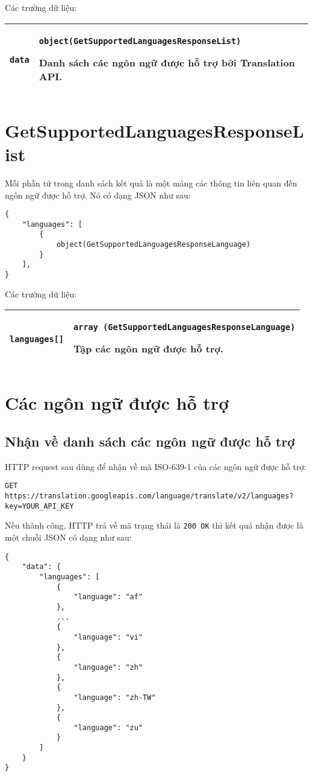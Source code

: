 \documentclass[../thesis.tex]{subfiles}
\begin{document}
Các trường dữ liệu:
\begin{center}
\begin{tabularx}{\textwidth}{|p{}|X|}
\hline
\lstinline{data} & \lstinline{object(GetSupportedLanguagesResponseList)}

Danh sách các ngôn ngữ được hỗ trợ bởi Translation API.\\
\hline
\end{tabularx}
\end{center}

\section{GetSupportedLanguagesResponseList}
Mỗi phần tử trong danh sách kết quả là một mảng các thông tin liên quan đến ngôn ngữ được hỗ trợ. Nó có dạng JSON như sau:

\begin{lstlisting}[style=link]
{
	"languages": [
		{
			object(GetSupportedLanguagesResponseLanguage)
		}
	],
}
\end{lstlisting}

Các trường dữ liệu:
\begin{center}
\begin{tabularx}{\textwidth}{|p{}|X|}
\hline
\lstinline{languages[]} & \lstinline{array (GetSupportedLanguagesResponseLanguage)}

Tập các ngôn ngữ được hỗ trợ.\\
\hline
\end{tabularx}
\end{center}

\section{Các ngôn ngữ được hỗ trợ}
\subsection{Nhận về danh sách các ngôn ngữ được hỗ trợ}
HTTP request sau dùng để nhận về mã ISO-639-1 của các ngôn ngữ được hỗ trợ:
\begin{lstlisting}[style=link]
GET https://translation.googleapis.com/language/translate/v2/languages?key=YOUR_API_KEY
\end{lstlisting}

Nếu thành công, HTTP trả về mã trạng thái là \lstinline{200 OK} thì kết quả nhận được là một chuỗi JSON có dạng như sau:

\begin{lstlisting}[style=link]
{
	"data": {
		"languages": [
			{
				"language": "af"
			},
			...
			{
				"language": "vi"
			},
			{
				"language": "zh"
			},
			{
				"language": "zh-TW"
			},
      		{
				"language": "zu"
			}
		]
	}
}
\end{lstlisting}
\end{document}

